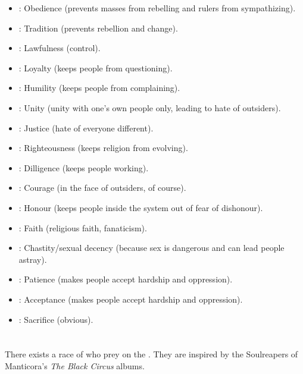 \begin{itemize}
	\item \Thimared{}: Obedience (prevents masses from rebelling and rulers from sympathizing). 
	\item \Hoshied{}: Tradition (prevents rebellion and change). 
	\item \Cushed{}: Lawfulness (control). 
	\item \Yemared{}: Loyalty (keeps people from questioning). 
	\item \Feazirah{}: Humility (keeps people from complaining). 
	\item \Hapheron{}: Unity (unity with one's own people only, leading to hate of outsiders). 
	\item \Izion{}: Justice (hate of everyone different). 
	\item \Razilah{}: Righteousness (keeps religion from evolving). 
	\item \Keshirah{}: Dilligence (keeps people working). 
	\item \Barion{}: Courage (in the face of outsiders, of course). 
	\item \Atzirah{}: Honour (keeps people inside the system out of fear of dishonour). 
	\item \Teshiron{}: Faith (religious faith, fanaticism). 
	\item \Yeziel{}: Chastity/sexual decency (because sex is dangerous and can lead people astray). 
	\item \Ishiel{}: Patience (makes people accept hardship and oppression). 
	\item \Omariel{}: Acceptance (makes people accept hardship and oppression). 
	\item \Gamishiel{}: Sacrifice (obvious). 
\end{itemize}



















\section{\Soulreapers}
\label{Soulreapers}
There exists a race of \soulreapers{} who prey on the \banes. They are inspired by the Soulreapers of Manticora's \emph{The Black Circus} albums. 


